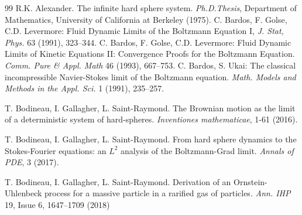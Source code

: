\documentclass[10pt, reqno]{amsart}
\theoremstyle{definition}
\theoremstyle{remark}
\numberwithin{equation}{section}
\begin{document}
\begin{thebibliography}{99}
 R.K. Alexander. The infinite hard sphere system. \emph{Ph.D.Thesis}, Department of Mathematics, University of California at Berkeley (1975).
 C. Bardos, F. Golse, C.D. Levermore: Fluid Dynamic Limits of the Boltzmann Equation I, \emph{J. Stat, Phys.} 63 (1991), 323--344.
 C. Bardos, F. Golse, C.D. Levermore: Fluid Dynamic Limits of Kinetic Equations II: Convergence Proofs for the Boltzmann Equation. \emph{Comm. Pure \& Appl. Math} 46 (1993), 667--753.
 C. Bardos, S. Ukai: The classical incompressible Navier-Stokes limit of the Boltzmann equation. \emph{Math. Models and Methods in the Appl. Sci.} 1 (1991), 235--257.


 T. Bodineau, I. Gallagher, L. Saint-Raymond. The Brownian motion as the limit of a deterministic system of hard-spheres. \emph{Inventiones mathematicae}, 1-61 (2016).

 T. Bodineau, I. Gallagher, L. Saint-Raymond. From hard sphere dynamics to the Stokes-Fourier equations: an $L^2$ analysis of the Boltzmann-Grad limit. \emph{Annals of PDE}, 3 (2017).

 T. Bodineau, I. Gallagher, L. Saint-Raymond. Derivation of an Ornstein-Uhlenbeck process for a massive particle in a rarified gas of particles. \emph{Ann. IHP} 19, Issue 6, 1647--1709 (2018)


\end{thebibliography}
\end{document}
